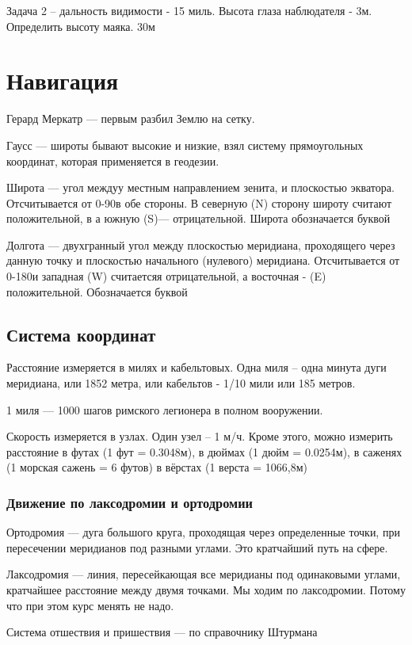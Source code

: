 \documentclass{article}        %
\begin{document}
Задача 2 -- дальность видимости - 15 миль. Высота глаза наблюдателя - 3м. Определить высоту маяка.  30м


\section{Навигация}
Герард Меркатр --- первым разбил Землю на сетку.

Гаусс --- широты бывают высокие и низкие, взял систему прямоугольных координат, которая применяется в геодезии.

Широта --- угол междуу местным направлением зенита, и плоскостью экватора. Отсчитывается от 0-90\degree в обе стороны. В северную (N) сторону широту считают положительной, в а южную (S)--- отрицательной. Широта обозначается буквой \phi

Долгота --- двухгранный угол между плоскостью меридиана, проходящего через данную точку и плоскостью начального (нулевого) меридиана. Отсчитывается от 0-180\degree и западная (W) считаетсяя отрицательной, а восточная - (E) положительной. Обозначается буквой \lambda

\subsection{Система координат}
Расстояние измеряется в милях и кабельтовых. 
Одна миля -- одна минута дуги меридиана, или 1852 метра, 
или кабельтов - 1/10 мили или 185 метров.

1 миля --- 1000 шагов римского легионера в полном вооружении.

Скорость измеряется в узлах. 
Один узел -- 1 м/ч. Кроме этого, можно измерить расстояние
в футах (1 фут = 0.3048м), 
в дюймах (1 дюйм = 0.0254м),
в саженях (1 морская сажень = 6 футов)
в вёрстах (1 верста = 1066,8м)

\subsubsection{Движение по лаксодромии и ортодромии}
Ортодромия --- дуга большого круга, проходящая через определенные точки, при пересечении меридианов под разными углами. Это кратчайший путь на сфере.

Лаксодромия --- линия, пересейкающая все меридианы под одинаковыми углами, кратчайшее расстояние между двумя точками. Мы ходим по лаксодромии. Потому что при этом курс менять не надо.

Система отшествия и пришествия --- по справочнику Штурмана
\end{document}
